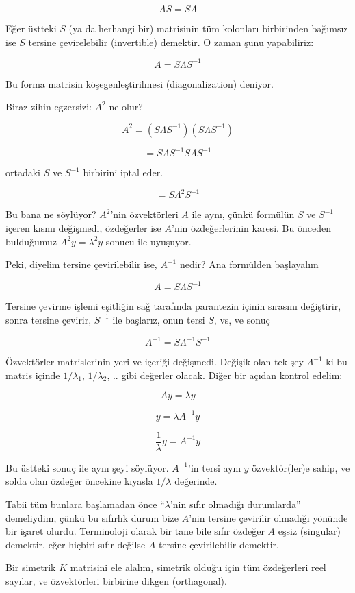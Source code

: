 \documentclass[12pt,fleqn]{article}\usepackage{../../common}
\begin{document}
$$ AS = S\Lambda $$

Eğer üstteki $S$ (ya da herhangi bir) matrisinin tüm kolonları birbirinden
bağımsız ise $S$ tersine çevirelebilir (invertible) demektir. O zaman şunu
yapabiliriz:

$$ A = S \Lambda S^{-1} $$

Bu forma matrisin köşegenleştirilmesi (diagonalization) deniyor. 

Biraz zihin egzersizi: $A^2$ ne olur? 

$$ A^2 = (S \Lambda S^{-1})(S \Lambda S^{-1}) $$

$$ = S \Lambda S^{-1}S \Lambda S^{-1} $$

ortadaki $S$ ve $S^{-1}$ birbirini iptal eder. 

$$ = S \Lambda^2 S^{-1} $$

Bu bana ne söylüyor? $A^2$'nin özvektörleri $A$ ile aynı, çünkü formülün
$S$ ve $S^{-1}$ içeren kısmı değişmedi, özdeğerler ise $A$'nin
özdeğerlerinin karesi. Bu önceden bulduğumuz $A^2y = \lambda^2y$ sonucu 
ile uyuşuyor.

Peki, diyelim tersine çevirilebilir ise, $A^{-1}$ nedir? Ana formülden 
başlayalım

$$ A = S \Lambda S^{-1} $$

Tersine çevirme işlemi eşitliğin sağ tarafında parantezin içinin sırasını
değiştirir, sonra tersine çevirir, $S^{-1}$ ile başlarız, onun tersi $S$,
vs, ve sonuç

$$ A^{-1} = S \Lambda^{-1}S^{-1} $$

Özvektörler matrislerinin yeri ve içeriği değişmedi. Değişik olan tek şey
$\Lambda^{-1}$ ki bu matris içinde $1/\lambda_1$, $1/\lambda_2$, .. gibi
değerler olacak. Diğer bir açıdan kontrol edelim:

$$ Ay = \lambda y $$

$$ y = \lambda A^{-1} y $$

$$ \frac{1}{\lambda}y =  A^{-1} y $$

Bu üstteki sonuç ile aynı şeyi söylüyor. $A^{-1}$'in tersi aynı $y$
özvektör(ler)e sahip, ve solda olan özdeğer öncekine kıyasla $1/\lambda$
değerinde. 

Tabii tüm bunlara başlamadan önce ``$\lambda$'nin sıfır olmadığı
durumlarda'' demeliydim, çünkü bu sıfırlık durum bize $A$'nin tersine
çevirilir olmadığı yönünde bir işaret olurdu. Terminoloji olarak bir tane
bile sıfır özdeğer $A$ eşsiz (singular) demektir, eğer hiçbiri sıfır
değilse $A$ tersine çevirilebilir demektir.

Bir simetrik $K$ matrisini ele alalım, simetrik olduğu için tüm özdeğerleri
reel sayılar, ve özvektörleri birbirine dikgen (orthagonal). 
\end{document}
